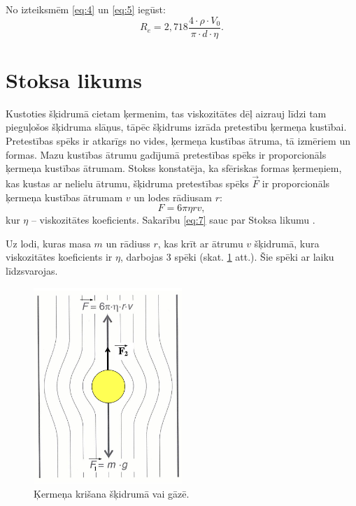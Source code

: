 \documentclass[a4paper]{article}
\begin{document}
No izteiksmēm \ref{eq:4} un \ref{eq:5} iegūst:
\begin{equation}
    R_e =2,718 \frac{4 \cdot \rho \cdot V_0}{\pi \cdot d \cdot \eta}.
\end{equation}
\pagebreak
\section{Stoksa likums}

Kustoties šķidrumā cietam ķermenim, tas viskozitātes dēļ aizrauj līdzi tam pieguļošos šķidruma slāņus, tāpēc šķidrums izrāda pretestību ķermeņa kustībai. Pretestības spēks ir atkarīgs no vides, ķermeņa kustības ātruma, tā izmēriem un formas. Mazu kustības ātrumu gadījumā pretestības spēks ir proporcionāls ķermeņa kustības ātrumam. Stokss konstatēja, ka sfēriskas formas ķermeņiem, kas kustas ar nelielu ātrumu, šķidruma pretestības spēks \( \vec{F} \) ir proporcionāls ķermeņa kustības ātrumam \( v \) un lodes rādiusam \( r \):
\begin{equation}\label{eq:7}
    F = 6\pi\eta r v,
\end{equation}
kur \( \eta \) -- viskozitātes koeficients.
Sakarību \ref{eq:7} sauc par Stoksa likumu \cite{Stokes}. 

Uz lodi, kuras masa \( m \) un rādiuss \( r \), kas krīt ar ātrumu \( v \) šķidrumā, kura viskozitātes koeficients ir \( \eta \), darbojas 3 spēki (skat. \ref{fig:forces} att.). Šie spēki ar laiku līdzsvarojas.

\begin{figure}[h]
    \centering
    \includegraphics[width=0.5\textwidth]{3att.png}
    \caption{Ķermeņa krišana šķidrumā vai gāzē.}
    \label{fig:forces}
\end{figure}
\end{document}
